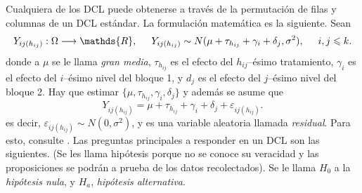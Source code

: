 \documentclass[11pt,a4paper]{article}
\begin{document}
Cualquiera de los DCL puede obtenerse a través de la permutación de filas y columnas de un DCL estándar.
La formulación matemática es la siguiente. Sean
\[
	Y_{ij(h_{ij})} : \Omega \longrightarrow \mathds{R} , \hspace{5mm} Y_{ij(h_{ij})} \sim N(\mu + \tau _{h_{ij}} + \gamma _i +\delta _j, \sigma ^2), \hspace{5mm} i,j \leqslant k.
\]
donde a \(\mu\) se le llama \textit{gran media}, \(\tau _{h_{ij}}\) es el efecto del \(h_{ij}\)--ésimo tratamiento, \(\gamma _i\) es el efecto del \(i\)--ésimo nivel del bloque 1, y \(d_j\) es el efecto del \(j\)--ésimo nivel del bloque 2.
Hay que estimar \(\{\mu , \tau _{h_{ij}} , \gamma _i , \delta _j\}\) y además se asume que
\begin{equation}
	Y_{ij(h_{ij})} = \mu + \tau _{h_{ij}} + \gamma _i+ \delta _j + \varepsilon _{ij(h_{ij})}.
	\label{eq:modelo}
\end{equation}
es decir, \(\varepsilon _{ij(h_{ij})} \sim N(0, \sigma ^2)\), y es una variable aleatoria llamada \textit{residual}.
Para esto, consulte .
Las preguntas principales a responder en un DCL son las siguientes.
(Se les llama hipótesis porque no se conoce su veracidad y las proposiciones se podrán a prueba de los datos recolectados).
Se le llama \(H_0\) a la \textit{hipótesis nula}, y \(H_a\), \textit{hipótesis alternativa}.
\end{document}
